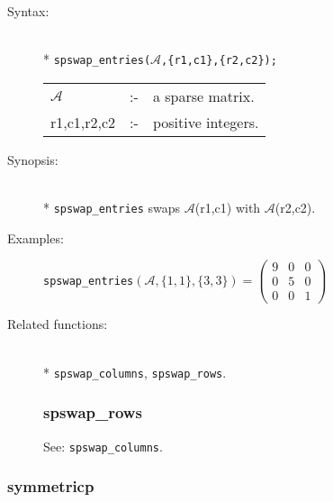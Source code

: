 \begin{description}
\item[Syntax:]\mbox{}\\*
\texttt{spswap\_entries($\mathcal{A}$,\{r1,c1\},\{r2,c2\});}\\[2mm]
\begin{tabular}{l l l}
$\mathcal{A}$  &:-& a sparse matrix. \\
r1,c1,r2,c2 &:-& positive integers.
\end{tabular}

\item[Synopsis:]\mbox{}\\*
\texttt{spswap\_entries} swaps $\mathcal{A}$(r1,c1) with
                $\mathcal{A}$(r2,c2).

\item[Examples:]
\texttt{spswap\_entries}\((\mathcal{A},\{1,1\},\{3,3\}) =
        \begin{pmatrix} 9 & 0 & 0 \\ 0 & 5 & 0 \\ 0 & 0 & 1 \end{pmatrix}\)

\item[Related functions:]\mbox{}\\*
\texttt{spswap\_columns}, \texttt{spswap\_rows}.


\subsubsection{spswap\_rows}
\label{sparse:spswap_rows}
\hypertarget{operator:SPSWAP_ROWS}{}
See: \texttt{spswap\_columns}.
\end{description}

\subsubsection{symmetricp}
\label{sparse:symmetricp}

